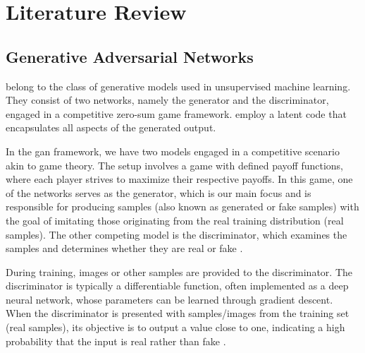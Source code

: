 \documentclass[conference]{IEEEtran}
\begin{document}





\section{Literature Review}

\subsection{Generative Adversarial Networks}

 belong to the class of generative models used in unsupervised machine learning. They consist of two networks, namely the generator and the discriminator, engaged in a competitive zero-sum game framework.  employ a latent code that encapsulates all aspects of the generated output.

In the \acrshort{gan} framework, we have two models engaged in a competitive scenario akin to game theory. The setup involves a game with defined payoff functions, where each player strives to maximize their respective payoffs. In this game, one of the networks serves as the generator, which is our main focus and is responsible for producing samples (also known as generated or fake samples) with the goal of imitating those originating from the real training distribution (real samples). The other competing model is the discriminator, which examines the samples and determines whether they are real or fake \cite{gans_overview_2018}.

During training, images or other samples are provided to the discriminator. The discriminator is typically a differentiable function, often implemented as a deep neural network, whose parameters can be learned through gradient descent. When the discriminator is presented with samples/images from the training set (real samples), its objective is to output a value close to one, indicating a high probability that the input is real rather than fake \cite{gans_overview_2018}.
\end{document}
